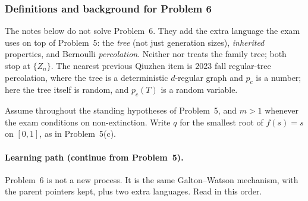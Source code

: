 \documentclass[11pt,a4paper]{article}
\begin{document}
\setcounter{section}{6}
\setcounter{definition}{0}

\subsubsection{Definitions and background for Problem 6}

The notes below do not solve Problem~6. They add the extra language the exam uses on top of Problem~5: the \emph{tree} (not just generation sizes), \emph{inherited} properties, and Bernoulli \emph{percolation}. Neither \citep{brzezniak1999} nor \citep[\S5.3.4]{durrett2010} treats the family tree; both stop at \(\{Z_n\}\). The nearest previous Qiuzhen item is 2023 fall regular-tree percolation, where the tree is a deterministic \(d\)-regular graph and \(p_c\) is a number; here the tree itself is random, and \(p_c(T)\) is a random variable.

Assume throughout the standing hypotheses of Problem~5, and \(m>1\) whenever the exam conditions on non-extinction. Write \(q\) for the smallest root of \(f(s)=s\) on \([0,1]\), as in Problem~5(c).

\paragraph{Learning path (continue from Problem~5).}
Problem~6 is not a new process. It is the same Galton--Watson mechanism, with the parent pointers kept, plus two extra languages. Read in this order.
\end{document}
